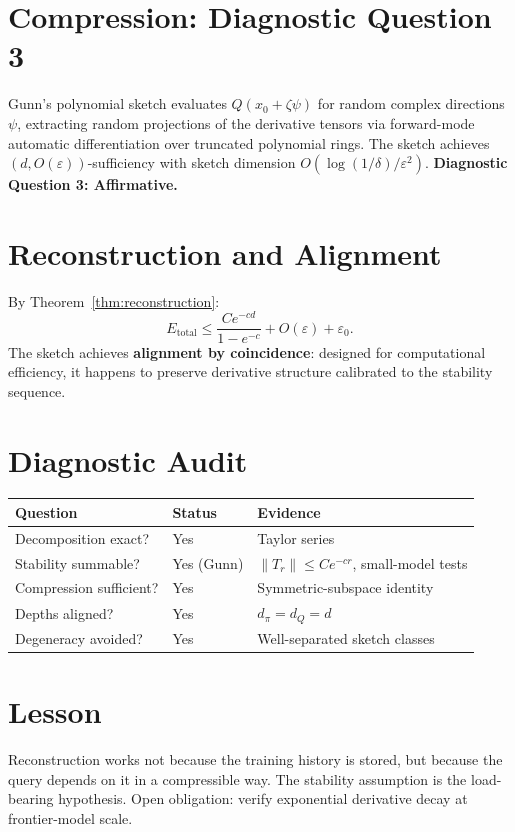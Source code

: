 \section{Compression: Diagnostic Question 3}

Gunn's polynomial sketch \cite{Gunn2026} evaluates $Q(x_0 + \zeta\psi)$ for random complex directions $\psi$, extracting random projections of the derivative tensors via forward-mode automatic differentiation over truncated polynomial rings. The sketch achieves $(d, O(\varepsilon))$-sufficiency with sketch dimension $O(\log(1/\delta)/\varepsilon^2)$.  \textbf{Diagnostic Question 3: Affirmative.}

\section{Reconstruction and Alignment}

By Theorem~\ref{thm:reconstruction}:
\[
  E_{\mathrm{total}} \leq \frac{Ce^{-cd}}{1-e^{-c}} + O(\varepsilon) + \varepsilon_0.
\]
The sketch achieves \textbf{alignment by coincidence}: designed for computational efficiency, it happens to preserve derivative structure calibrated to the stability sequence.

\section{Diagnostic Audit}

\begin{center}\small
\begin{tabular}{lll}
\toprule
Question & Status & Evidence \\
\midrule
Decomposition exact? & Yes & Taylor series \\
Stability summable? & Yes (Gunn) & $\|T_r\| \leq Ce^{-cr}$, small-model tests \\
Compression sufficient? & Yes & Symmetric-subspace identity \\
Depths aligned? & Yes & $d_\pi = d_Q = d$ \\
Degeneracy avoided? & Yes & Well-separated sketch classes \\
\bottomrule
\end{tabular}
\end{center}

\section{Lesson}

Reconstruction works not because the training history is stored, but because the query depends on it in a compressible way. The stability assumption is the load-bearing hypothesis. Open obligation: verify exponential derivative decay at frontier-model scale.
